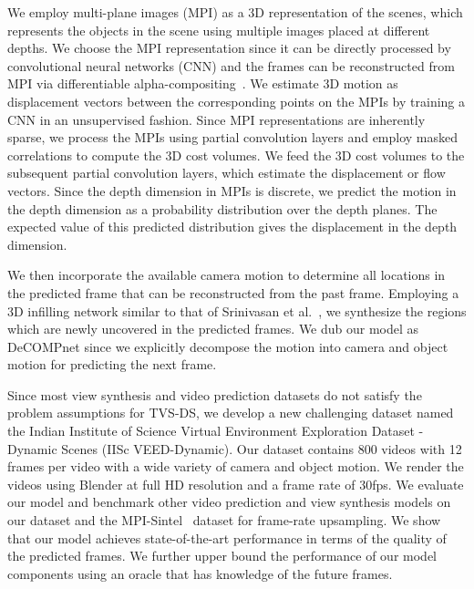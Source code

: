 \documentclass[preprint]{vgtc}
\def\etal{et al.}
\begin{document}
    We employ multi-plane images (MPI) as a 3D representation of the scenes, which represents the objects in the scene using multiple images placed at different depths.
    We choose the MPI representation since it can be directly processed by convolutional neural networks (CNN) and the frames can be reconstructed from MPI via differentiable alpha-compositing~\cite{srinivasan2019pushing}.
    We estimate 3D motion as displacement vectors between the corresponding points on the MPIs by training a CNN in an unsupervised fashion.
    Since MPI representations are inherently sparse, we process the MPIs using partial convolution layers and employ masked correlations to compute the 3D cost volumes.
    We feed the 3D cost volumes to the subsequent partial convolution layers, which estimate the displacement or flow vectors.
    Since the depth dimension in MPIs is discrete, we predict the motion in the depth dimension as a probability distribution over the depth planes.
    The expected value of this predicted distribution gives the displacement in the depth dimension.

    We then incorporate the available camera motion to determine all locations in the predicted frame that can be reconstructed from the past frame.
Employing a 3D infilling network similar to that of Srinivasan \etal~\cite{srinivasan2019pushing}, we synthesize the regions which are newly uncovered in the predicted frames.
    We dub our model as DeCOMPnet since we explicitly decompose the motion into camera and object motion for predicting the next frame.

    Since most view synthesis and video prediction datasets do not satisfy the problem assumptions for TVS-DS, we develop a new challenging dataset named the Indian Institute of Science Virtual Environment Exploration Dataset - Dynamic Scenes (IISc VEED-Dynamic).
    Our dataset contains 800 videos with 12 frames per video with a wide variety of camera and object motion.
    We render the videos using Blender at full HD resolution and a frame rate of 30fps.
    We evaluate our model and benchmark other video prediction and view synthesis models on our dataset and the MPI-Sintel~\cite{butler2012sintel} dataset for frame-rate upsampling.
    We show that our model achieves state-of-the-art performance in terms of the quality of the predicted frames.
    We further upper bound the performance of our model components using an oracle that has knowledge of the future frames.
\end{document}
